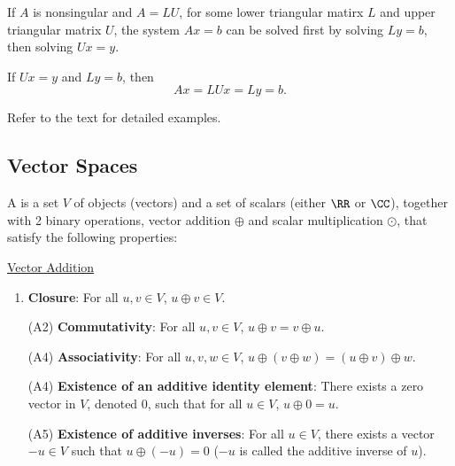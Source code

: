 If $A$ is nonsingular and $A = LU$, for some lower triangular matirx $L$ and upper triangular matrix $U$,
the system $Ax = b$ can be solved first by solving $Ly = b$, then solving $Ux = y$.

If $Ux = y$ and $Ly = b$, then 
\begin{equation*}
  Ax = LUx = Ly = b.
\end{equation*}

Refer to the text for detailed examples.

\subsection{Vector Spaces}
\begin{definition}
  A  is a set $V$ of objects (vectors) and a set of scalars (either $\RR$ or $\CC$), 
  together with 2 binary operations, vector addition $\oplus$ and scalar multiplication $\odot$, that
  satisfy the following properties:
  
  \underline{Vector Addition}
  \begin{enumerate}[(A1)]
    \item \textbf{Closure}: For all $u, v \in V$, $u \oplus v \in V$.
    \item [(A2)] \textbf{Commutativity}: For all $u, v \in V$, $u \oplus v = v \oplus u$.
    \item [(A4)] \textbf{Associativity}: For all $u, v, w \in V$, $u \oplus (v \oplus w) = (u \oplus v) \oplus w$.
    \item [(A4)] \textbf{Existence of an additive identity element}: There exists a zero vector in $V$, denoted $0$,
      such that for all $u \in V$, $u \oplus 0 = u$.
    \item [(A5)] \textbf{Existence of additive inverses}: For all $u \in V$, there exists a vector $-u \in V$ such that
      $u \oplus (-u) = 0$ ($-u$ is called the additive inverse of $u$).
  \end{enumerate}


\end{definition}
